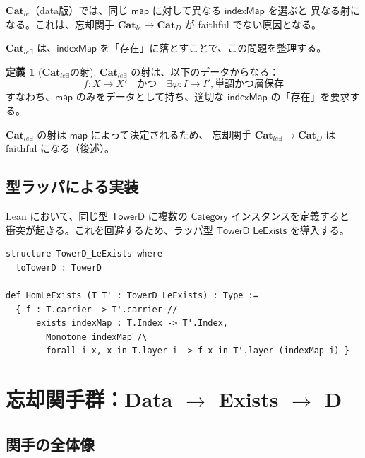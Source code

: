 \documentclass[a4paper,11pt]{ltjsarticle}
\theoremstyle{definition}
\newtheorem{definition}{定義}[section]
\theoremstyle{plain}
\newcommand{\CatD}{\mathbf{Cat}_D}
\newcommand{\Catle}{\mathbf{Cat}_{le}}
\newcommand{\CatleE}{\mathbf{Cat}_{le\exists}}
\newcommand{\TowerD}{\mathsf{TowerD}}
\newcommand{\indexMap}{\mathsf{indexMap}}
\begin{document}
$\Catle$（data版）では、同じ $\mathsf{map}$ に対して異なる $\indexMap$ を選ぶと
異なる射になる。これは、忘却関手 $\Catle \to \CatD$ が faithful でない原因となる。

$\CatleE$ は、$\indexMap$ を「存在」に落とすことで、この問題を整理する。

\begin{definition}[$\CatleE$の射]
\label{def:hom-le-exists}
$\CatleE$ の射は、以下のデータからなる：
\[
  f : X \to X' \quad \text{かつ} \quad 
  \exists \varphi : I \to I', \text{単調かつ層保存}
\]
すなわち、$\mathsf{map}$ のみをデータとして持ち、適切な $\indexMap$ の「存在」を要求する。
\end{definition}

\begin{keypoint}
$\CatleE$ の射は $\mathsf{map}$ によって決定されるため、
忘却関手 $\CatleE \to \CatD$ は faithful になる（後述）。
\end{keypoint}

\subsection{型ラッパによる実装}

Lean において、同じ型 $\TowerD$ に複数の $\mathsf{Category}$ インスタンスを定義すると
衝突が起きる。これを回避するため、ラッパ型 $\mathsf{TowerD\_LeExists}$ を導入する。

\begin{leancode}
\begin{lstlisting}
structure TowerD_LeExists where
  toTowerD : TowerD

def HomLeExists (T T' : TowerD_LeExists) : Type :=
  { f : T.carrier -> T'.carrier //
      exists indexMap : T.Index -> T'.Index,
        Monotone indexMap /\
        forall i x, x in T.layer i -> f x in T'.layer (indexMap i) }
\end{lstlisting}
\end{leancode}

\section{忘却関手群：Data $\to$ Exists $\to$ D}
\label{sec:forgetful-functors}

\subsection{関手の全体像}
\end{document}
